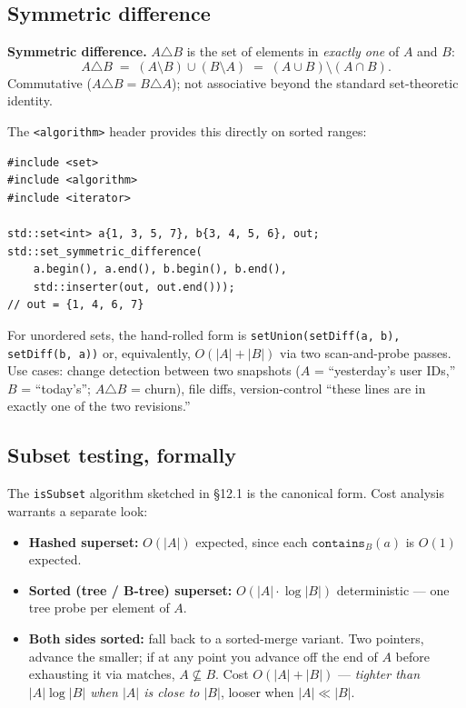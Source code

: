 \documentclass[11pt]{article}
\begin{document}
\subsection*{Symmetric difference}

\begin{defnbox}
\textbf{Symmetric difference.} $A \triangle B$ is the set of
elements in \emph{exactly one} of $A$ and $B$:
\[
A \triangle B \;=\; (A \setminus B) \cup (B \setminus A)
\;=\; (A \cup B) \setminus (A \cap B).
\]
Commutative ($A \triangle B = B \triangle A$); not associative
beyond the standard set-theoretic identity.
\end{defnbox}

The \texttt{<algorithm>} header provides this directly on sorted
ranges:

\begin{lstlisting}[basicstyle=\ttfamily\small,frame=single]
#include <set>
#include <algorithm>
#include <iterator>

std::set<int> a{1, 3, 5, 7}, b{3, 4, 5, 6}, out;
std::set_symmetric_difference(
    a.begin(), a.end(), b.begin(), b.end(),
    std::inserter(out, out.end()));
// out = {1, 4, 6, 7}
\end{lstlisting}

For unordered sets, the hand-rolled form is
\verb|setUnion(setDiff(a, b), setDiff(b, a))| or, equivalently,
$O(|A| + |B|)$ via two scan-and-probe passes. Use cases: change
detection between two snapshots ($A$ = ``yesterday's user IDs,'' $B$
= ``today's''; $A \triangle B$ = churn), file diffs, version-control
``these lines are in exactly one of the two revisions.''

\subsection*{Subset testing, formally}

The \texttt{isSubset} algorithm sketched in \S12.1 is the canonical
form. Cost analysis warrants a separate look:

\begin{itemize}[leftmargin=*]
    \item \textbf{Hashed superset:} $O(|A|)$ expected, since each
          $\texttt{contains}_B(a)$ is $O(1)$ expected.
    \item \textbf{Sorted (tree / B-tree) superset:}
          $O(|A| \cdot \log |B|)$ deterministic --- one tree probe
          per element of $A$.
    \item \textbf{Both sides sorted:} fall back to a sorted-merge
          variant. Two pointers, advance the smaller; if at any
          point you advance off the end of $A$ before exhausting it
          via matches, $A \not\subseteq B$. Cost $O(|A| + |B|)$ ---
          \emph{tighter than $|A| \log |B|$ when $|A|$ is close to
          $|B|$}, looser when $|A| \ll |B|$.
\end{itemize}
\end{document}

